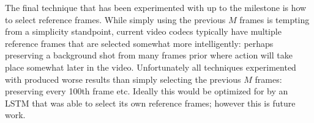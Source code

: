 \documentclass[10pt,twocolumn,letterpaper]{article}
\begin{document}
The final technique that has been experimented with up to the milestone is how to select reference frames. While simply using the previous $M$ frames is tempting from a simplicity standpoint, current video codecs typically have multiple reference frames that are selected somewhat more intelligently: perhaps preserving a background shot from many frames prior where action will take place somewhat later in the video. Unfortunately all techniques experimented with produced worse results than simply selecting the previous $M$ frames: preserving every 100th frame etc. Ideally this would be optimized for by an LSTM that was able to select its own reference frames; however this is future work.


{\small


}
\end{document}
